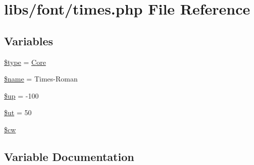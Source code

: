 \hypertarget{times_8php}{}\section{libs/font/times.php File Reference}
\label{times_8php}
\subsection*{Variables}
\begin{DoxyCompactItemize}
\item 
\hyperlink{times_8php_a9a4a6fba2208984cabb3afacadf33919}{\$type} = \textquotesingle{}\hyperlink{class_core}{Core}\textquotesingle{}
\item 
\hyperlink{times_8php_ab2fc40d43824ea3e1ce5d86dee0d763b}{\$name} = \textquotesingle{}Times-\/Roman\textquotesingle{}
\item 
\hyperlink{times_8php_a6b5ad2ac55f9df46e8f34e78fbd6f176}{\$up} = -\/100
\item 
\hyperlink{times_8php_aadd3f841051043ee58e587e840e8dd0b}{\$ut} = 50
\item 
\hyperlink{times_8php_ac2951b03dbb0317e6c61ec920b7479dc}{\$cw}
\end{DoxyCompactItemize}


\subsection{Variable Documentation}
\hypertarget{times_8php_ac2951b03dbb0317e6c61ec920b7479dc}{}
